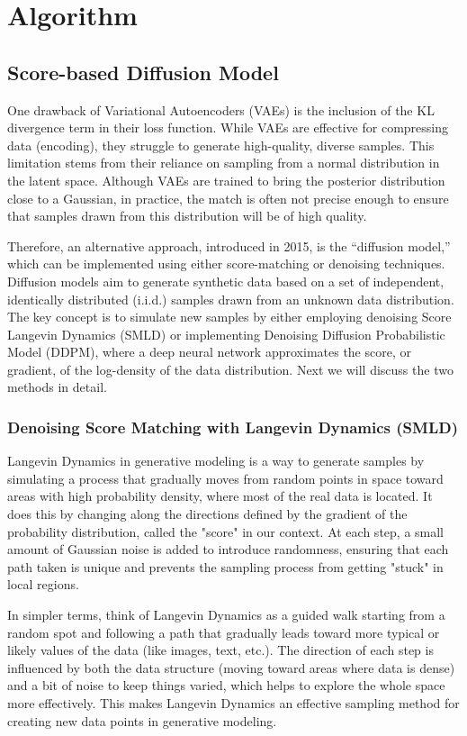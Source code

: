 \chapter{Algorithm}
\section{Score-based Diffusion Model}
One drawback of Variational Autoencoders (VAEs) is the inclusion of the KL divergence term in their loss function. While VAEs are effective for compressing data (encoding), they struggle to generate high-quality, diverse samples. This limitation stems from their reliance on sampling from a normal distribution in the latent space. Although VAEs are trained to bring the posterior distribution close to a Gaussian, in practice, the match is often not precise enough to ensure that samples drawn from this distribution will be of high quality.

Therefore, an alternative approach, introduced in 2015, is the “diffusion model,” which can be implemented using either score-matching or denoising techniques. Diffusion models aim to generate synthetic data based on a set of independent, identically distributed (i.i.d.) samples drawn from an unknown data distribution. The key concept is to simulate new samples by either employing denoising Score Langevin Dynamics (SMLD) or implementing Denoising Diffusion Probabilistic Model (DDPM), where a deep neural network approximates the score, or gradient, of the log-density of the data distribution. Next we will discuss the two methods in detail.

\subsection{Denoising Score Matching with Langevin Dynamics (SMLD)}
Langevin Dynamics in generative modeling is a way to generate samples by simulating a process that gradually moves from random points in space toward areas with high probability density, where most of the real data is located. It does this by changing along the directions defined by the gradient of the probability distribution, called the "score" in our context. At each step, a small amount of Gaussian noise is added to introduce randomness, ensuring that each path taken is unique and prevents the sampling process from getting "stuck" in local regions.

In simpler terms, think of Langevin Dynamics as a guided walk starting from a random spot and following a path that gradually leads toward more typical or likely values of the data (like images, text, etc.). The direction of each step is influenced by both the data structure (moving toward areas where data is dense) and a bit of noise to keep things varied, which helps to explore the whole space more effectively. This makes Langevin Dynamics an effective sampling method for creating new data points in generative modeling.

